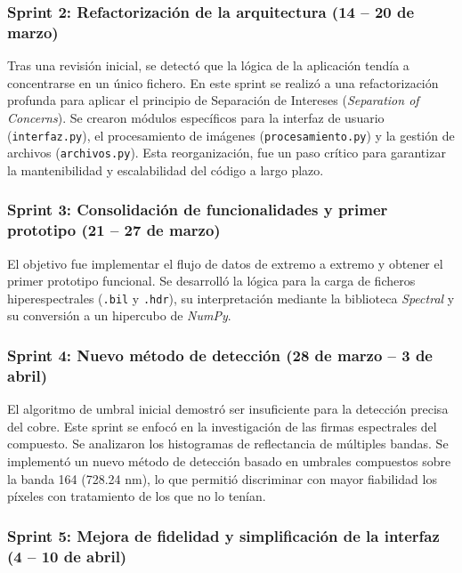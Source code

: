 \subsubsection{Sprint 2: Refactorización de la arquitectura (14 – 20 de marzo)}

Tras una revisión inicial, se detectó que la lógica de la aplicación tendía a concentrarse en un único fichero. En este sprint se realizó a una refactorización profunda para aplicar el principio de Separación de Intereses (\textit{Separation of Concerns}). Se crearon módulos específicos para la interfaz de usuario (\verb|interfaz.py|), el procesamiento de imágenes (\verb|procesamiento.py|) y la gestión de archivos (\verb|archivos.py|). Esta reorganización, fue un paso crítico para garantizar la mantenibilidad y escalabilidad del código a largo plazo.


\subsubsection{Sprint 3: Consolidación de funcionalidades y primer prototipo (21 – 27 de marzo)}

El objetivo fue implementar el flujo de datos de extremo a extremo y obtener el primer prototipo funcional. Se desarrolló la lógica para la carga de ficheros hiperespectrales (\verb|.bil| y \verb|.hdr|), su interpretación mediante la biblioteca \textit{Spectral} y su conversión a un hipercubo de \textit{NumPy}. 

\subsubsection{Sprint 4: Nuevo método de detección (28 de marzo – 3 de abril)}

El algoritmo de umbral inicial demostró ser insuficiente para la detección precisa del cobre. Este sprint se enfocó en la investigación de las firmas espectrales del compuesto. Se analizaron los histogramas de reflectancia de múltiples bandas. Se implementó un nuevo método de detección basado en umbrales compuestos sobre la banda 164 (728.24 nm), lo que permitió discriminar con mayor fiabilidad los píxeles con tratamiento de los que no lo tenían.


\subsubsection{Sprint 5: Mejora de fidelidad y simplificación de la interfaz (4 – 10 de abril)}


